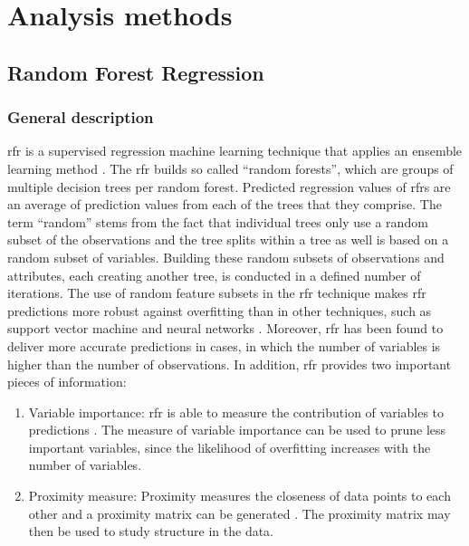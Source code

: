 \documentclass[a4paper, 11pt, oneside]{Thesis}  %
\begin{document}
 
 \chapter{Analysis methods}
 \label{Analysis_methods}

\section{Random Forest Regression}
\label{sec:random_forest_regression}

\subsection{General description}

\ac{rfr} is a supervised regression machine learning technique that applies an ensemble learning method \cite{Gromping.2009}. The \ac{rfr} builds so called “random forests”, which are groups of multiple decision trees per random forest. Predicted regression values of \ac{rfr}s are an average of prediction values from each of the trees that they comprise. The term “random” stems from the fact that individual trees only use a random subset of the observations and the tree splits within a tree as well is based on a random subset of variables. Building these random subsets of observations and attributes, each creating another tree, is conducted in a defined number of iterations. The use of random feature subsets in the \ac{rfr} technique makes \ac{rfr} predictions more robust against overfitting than in other techniques, such as support vector machine and neural networks \cite{Liaw.2002}. Moreover, \ac{rfr} has been found to deliver more accurate predictions in cases, in which the number of variables is higher than the number of observations. In addition, \ac{rfr} provides two important pieces of information:

\begin{enumerate}
\item	 Variable importance: \ac{rfr} is able to measure the contribution of variables to predictions \cite{Liaw.2002}. The measure of variable importance can be used to prune less important variables, since the likelihood of overfitting increases with the number of variables.
\item Proximity measure: Proximity measures the closeness of data points to each other and a proximity matrix can be generated \cite{Liaw.2002}. The proximity matrix may then be used to study structure in the data.
\end{enumerate}
\end{document}

